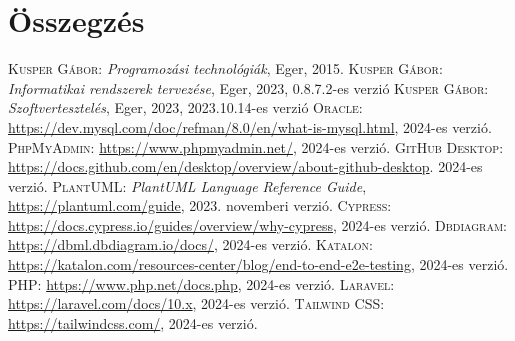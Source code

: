 \documentclass[]{thesis-ekf}
\theoremstyle{definition}
\theoremstyle{remark}
\begin{document}
	\chapter*{Összegzés}
	
	\begin{thebibliography}{2}
		\textsc{Kusper Gábor}: \emph{Programozási technológiák}, Eger, 2015.
		\textsc{Kusper Gábor}: \emph{Informatikai rendszerek tervezése}, Eger, 2023, 0.8.7.2-es verzió
		\textsc{Kusper Gábor}: \emph{Szoftvertesztelés}, Eger, 2023, 2023.10.14-es verzió
		\textsc{Oracle}: \url{https://dev.mysql.com/doc/refman/8.0/en/what-is-mysql.html}, 2024-es verzió.
		\textsc{PhpMyAdmin}: \url{https://www.phpmyadmin.net/}, 2024-es verzió.
		\textsc{GitHub Desktop}: \url{https://docs.github.com/en/desktop/overview/about-github-desktop}. 2024-es verzió.
		\textsc{PlantUML}: \emph{PlantUML Language Reference Guide}, \url{https://plantuml.com/guide}, 2023. novemberi verzió.
		\textsc{Cypress}: \url{https://docs.cypress.io/guides/overview/why-cypress}, 2024-es verzió.
		\textsc{Dbdiagram}: \url{https://dbml.dbdiagram.io/docs/}, 2024-es verzió.
		\textsc{Katalon}: \url{https://katalon.com/resources-center/blog/end-to-end-e2e-testing}, 2024-es verzió.
		\textsc{PHP}: \url{https://www.php.net/docs.php}, 2024-es verzió.
		\textsc{Laravel:} \url{https://laravel.com/docs/10.x}, 2024-es verzió.
		\textsc{Tailwind CSS:} \url{https://tailwindcss.com/}, 2024-es verzió.
	\end{thebibliography}
	
\end{document}
